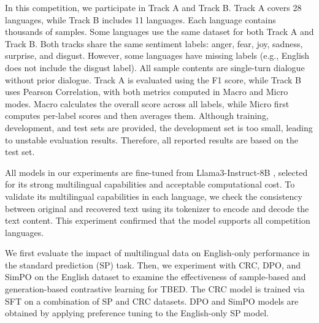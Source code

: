 \documentclass[11pt]{article}
\begin{document}
In this competition, we participate in Track A and Track B. Track A covers 28 languages, while Track B includes 11 languages. Each language contains thousands of samples. Some languages use the same dataset for both Track A and Track B. Both tracks share the same sentiment labels: anger, fear, joy, sadness, surprise, and disgust. However, some languages have missing labels (e.g., English does not include the disgust label). All sample contents are single-turn dialogue without prior dialogue. Track A is evaluated using the F1 score, while Track B uses Pearson Correlation, with both metrics computed in Macro and Micro modes. Macro calculates the overall score across all labels, while Micro first computes per-label scores and then averages them. Although training, development, and test sets are provided, the development set is too small, leading to unstable evaluation results. Therefore, all reported results are based on the test set.


All models in our experiments are fine-tuned from Llama3-Instruct-8B  \cite{dubey2024llama}, selected for its strong multilingual capabilities and acceptable computational cost. To validate its multilingual capabilities in each language, we check the consistency between original and recovered text using its tokenizer to encode and decode the text content. This experiment confirmed that the model supports all competition languages.


We first evaluate the impact of multilingual data on English-only performance in the standard prediction (SP) task. Then, we experiment with CRC, DPO, and SimPO on the English dataset to examine the effectiveness of sample-based and generation-based contrastive learning for TBED. The CRC model is trained via SFT on a combination of SP and CRC datasets. DPO and SimPO models are obtained by applying preference tuning to the English-only SP model.
\end{document}
